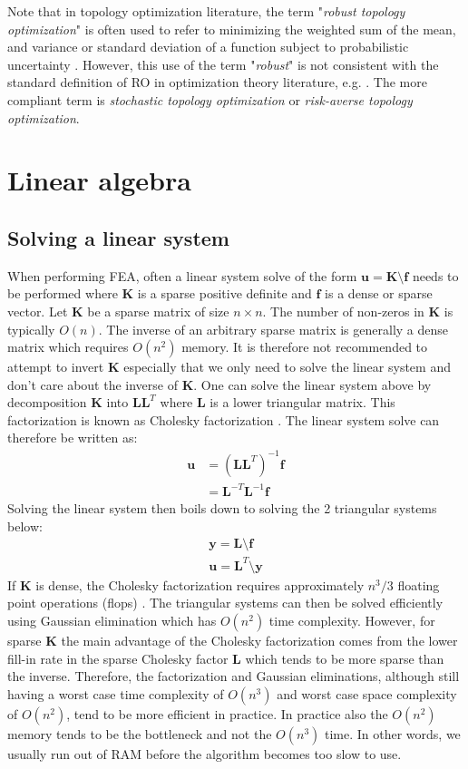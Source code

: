 Note that in topology optimization literature, the term "\textit{robust topology optimization}" is often used to refer to minimizing the weighted sum of the mean, and variance or standard deviation of a function subject to probabilistic uncertainty \citep{Dunning2013,Zhao2014,Cuellar2018}. However, this use of the term "\textit{robust}" is not consistent with the standard definition of RO in optimization theory literature, e.g. \cite{AharonBen-Tal2009}. The more compliant term is \textit{stochastic topology optimization} or \textit{risk-averse topology optimization}.

\newpage
\section{Linear algebra}

\subsection{Solving a linear system}

When performing FEA, often a linear system solve of the form $\bm{u} = \bm{K} \setminus \bm{f}$ needs to be performed where $\bm{K}$ is a sparse positive definite and $\bm{f}$ is a dense or sparse vector. Let $\bm{K}$ be a sparse matrix of size $n \times n$. The number of non-zeros in $\bm{K}$ is typically $O(n)$. The inverse of an arbitrary sparse matrix is generally a dense matrix which requires $O(n^2)$ memory. It is therefore not recommended to attempt to invert $\bm{K}$ especially that we only need to solve the linear system and don't care about the inverse of $\bm{K}$. One can solve the linear system above by decomposition $\bm{K}$ into $\bm{L} \bm{L}^T$ where $\bm{L}$ is a lower triangular matrix. This factorization is known as Cholesky factorization \citep{Golub1996}. The linear system solve can therefore be written as:
\begin{align}
    \bm{u} & = (\bm{L} \bm{L}^T)^{-1} \bm{f} \\
    & = \bm{L}^{-T} \bm{L}^{-1} \bm{f}
\end{align}
Solving the linear system then boils down to solving the 2 triangular systems below:
\begin{align}
    \bm{y} = \bm{L} \setminus \bm{f} \\
    \bm{u} = \bm{L}^T \setminus \bm{y}
\end{align}
If $\bm{K}$ is dense, the Cholesky factorization requires approximately $n^3 / 3$ floating point operations (flops) \citep{Golub1996}. The triangular systems can then be solved efficiently using Gaussian elimination which has $O(n^2)$ time complexity. However, for sparse $\bm{K}$ the main advantage of the Cholesky factorization comes from the lower fill-in rate in the sparse Cholesky factor $\bm{L}$ which tends to be more sparse than the inverse. Therefore, the factorization and Gaussian eliminations, although still having a worst case time complexity of $O(n^3)$ and worst case space complexity of $O(n^2)$, tend to be more efficient in practice. In practice also the $O(n^2)$ memory tends to be the bottleneck and not the $O(n^3)$ time. In other words, we usually run out of RAM before the algorithm becomes too slow to use.

